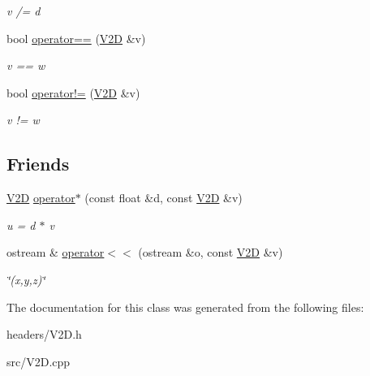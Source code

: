 \begin{DoxyCompactItemize}
\begin{DoxyCompactList}\small\item\em v /= d \end{DoxyCompactList}\item 
\hypertarget{class_v2_d_a41af4794bd110944bd88094525f8f2eb}{bool \hyperlink{class_v2_d_a41af4794bd110944bd88094525f8f2eb}{operator==} (\hyperlink{class_v2_d}{V2\-D} \&v)}\label{class_v2_d_a41af4794bd110944bd88094525f8f2eb}

\begin{DoxyCompactList}\small\item\em v == w \end{DoxyCompactList}\item 
\hypertarget{class_v2_d_a3f2a0a369dd816bf5e06acc056336e2d}{bool \hyperlink{class_v2_d_a3f2a0a369dd816bf5e06acc056336e2d}{operator!=} (\hyperlink{class_v2_d}{V2\-D} \&v)}\label{class_v2_d_a3f2a0a369dd816bf5e06acc056336e2d}

\begin{DoxyCompactList}\small\item\em v != w \end{DoxyCompactList}\end{DoxyCompactItemize}
\subsection*{Friends}
\begin{DoxyCompactItemize}
\item 
\hypertarget{class_v2_d_a3dfc4e53fe7e627abe3ca03ea03e3288}{\hyperlink{class_v2_d}{V2\-D} \hyperlink{class_v2_d_a3dfc4e53fe7e627abe3ca03ea03e3288}{operator$\ast$} (const float \&d, const \hyperlink{class_v2_d}{V2\-D} \&v)}\label{class_v2_d_a3dfc4e53fe7e627abe3ca03ea03e3288}

\begin{DoxyCompactList}\small\item\em u = d $\ast$ v \end{DoxyCompactList}\item 
\hypertarget{class_v2_d_ad016e30b53d24828202d536c445b7505}{ostream \& \hyperlink{class_v2_d_ad016e30b53d24828202d536c445b7505}{operator$<$$<$} (ostream \&o, const \hyperlink{class_v2_d}{V2\-D} \&v)}\label{class_v2_d_ad016e30b53d24828202d536c445b7505}

\begin{DoxyCompactList}\small\item\em \char`\"{}(x,y,z)\char`\"{} \end{DoxyCompactList}\end{DoxyCompactItemize}


The documentation for this class was generated from the following files\-:\begin{DoxyCompactItemize}
\item 
headers/V2\-D.\-h\item 
src/V2\-D.\-cpp\end{DoxyCompactItemize}
